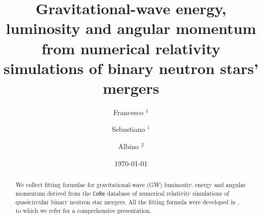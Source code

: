 \documentclass[aps,prl,onecolumn,superscriptaddress,groupedaddress,nofootinbib,floatfix,notitlepage]{revtex4-1}
\begin{document}
\title{Gravitational-wave energy, luminosity and angular momentum from 
numerical relativity simulations of binary neutron stars' mergers}
%
\author{Francesco $^{1}$}
\author{Sebastiano $^{1}$}
\author{Albino $^{2}$}
%

\date{\today}

\begin{abstract}
We collect fitting formulae for gravitational-wave (GW) luminosity, energy and angular momentum 
derived from the {\tt CoRe} database of numerical relativity simulations of quasicircular binary neutron star mergers.
All the fitting formula were developed in \cite{Zappa:2017xba}, to which we refer for a comprehensive presentation. 
\end{abstract}

\maketitle


\end{document}
